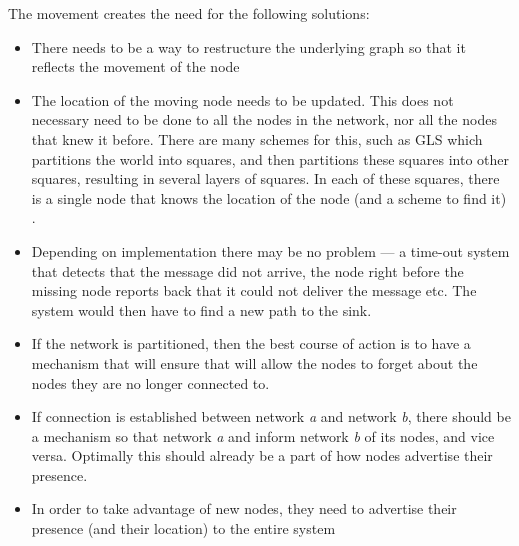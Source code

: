 The movement creates the need for the following solutions:
\begin{itemize}
\item There needs to be a way to restructure the underlying graph so that it reflects the movement of the node \cite{practical}
\item The location of the moving node needs to be updated. This does not necessary need to be done to all the nodes in the network, nor all the nodes that knew it before. There are many schemes for this, such as GLS \cite{scaleLocation} which partitions the world into squares, and then partitions these squares into other squares, resulting in several layers of squares. In each of these squares, there is a single node that knows the location of the node (and a scheme to find it) \cite{scaleLocation}.
\item Depending on implementation there may be no problem --- a time-out system that detects that the message did not arrive, the node right before the missing node reports back that it could not deliver the message etc. The system would then have to find a new path to the sink.
\item If the network is partitioned, then the best course of action is to have a mechanism that will ensure that will allow the nodes to forget about the nodes they are no longer connected to. 
\item If connection is established between network \emph{a} and network \emph{b}, there should be a mechanism so that network \emph{a} and inform network \emph{b} of its nodes, and vice versa. Optimally this should already be a part of how nodes advertise their presence.
\item In order to take advantage of new nodes, they need to advertise their presence (and their location) to the entire system 
\end{itemize}
